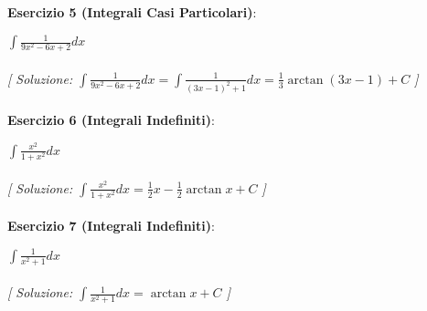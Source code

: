 \documentclass{article}
\begin{document}
\textbf{Esercizio 5 (Integrali Casi Particolari)}:\\
\par $\int \frac{1}{9x^2-6x+2}  dx$ \\\\

\textit{[ Soluzione: $\int \frac{1}{9x^2-6x+2}  dx=\int \frac{1}{(3x-1)^2+1} dx =\frac{1}{3}\arctan(3x-1)+ C$ ]}\\\\

\textbf{Esercizio 6 (Integrali Indefiniti)}:\\
\par $\int \frac{x^2}{1 + x^2}  dx$ \\\\

\textit{[ Soluzione: $\int \frac{x^2}{1 + x^2}  dx = \frac{1}{2}x - \frac{1}{2}\arctan x + C$ ]}\\\\

\textbf{Esercizio 7 (Integrali Indefiniti)}:\\
\par $\int \frac{1}{x^2 + 1}  dx$ \\\\

\textit{[ Soluzione: $\int \frac{1}{x^2 + 1}  dx = \arctan x + C$ ]}\\\\
\end{document}
